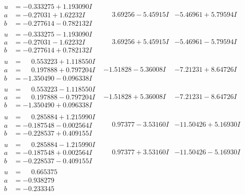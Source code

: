 \documentclass[1p]{elsarticle_modified}
\theoremstyle{definition}
\begin{document}
$$\begin{array}{c|c|c}
\begin{aligned}
u &= -0.333275 + 1.193090 I \\
a &= -0.27031 + 1.62232 I \\
b &= -0.277614 - 0.782132 I\end{aligned}
 & \phantom{-}3.69256 - 5.45915 I & -5.46961 + 5.79594 I \\ \hline\begin{aligned}
u &= -0.333275 - 1.193090 I \\
a &= -0.27031 - 1.62232 I \\
b &= -0.277614 + 0.782132 I\end{aligned}
 & \phantom{-}3.69256 + 5.45915 I & -5.46961 - 5.79594 I \\ \hline\begin{aligned}
u &= \phantom{-}0.553223 + 1.118550 I \\
a &= \phantom{-}0.197888 + 0.797204 I \\
b &= -1.350490 - 0.096338 I\end{aligned}
 & -1.51828 - 5.36008 I & -7.21231 + 8.64726 I \\ \hline\begin{aligned}
u &= \phantom{-}0.553223 - 1.118550 I \\
a &= \phantom{-}0.197888 - 0.797204 I \\
b &= -1.350490 + 0.096338 I\end{aligned}
 & -1.51828 + 5.36008 I & -7.21231 - 8.64726 I \\ \hline\begin{aligned}
u &= \phantom{-}0.285884 + 1.215990 I \\
a &= -0.187548 - 0.002564 I \\
b &= -0.228537 + 0.409155 I\end{aligned}
 & \phantom{-}0.97377 - 3.53160 I & -11.50426 + 5.16930 I \\ \hline\begin{aligned}
u &= \phantom{-}0.285884 - 1.215990 I \\
a &= -0.187548 + 0.002564 I \\
b &= -0.228537 - 0.409155 I\end{aligned}
 & \phantom{-}0.97377 + 3.53160 I & -11.50426 - 5.16930 I \\ \hline\begin{aligned}
u &= \phantom{-}0.665375\phantom{ +0.000000I} \\
a &= -0.938279\phantom{ +0.000000I} \\
b &= -0.233345\phantom{ +0.000000I}\end{aligned}

\end{array}$$
\end{document}
